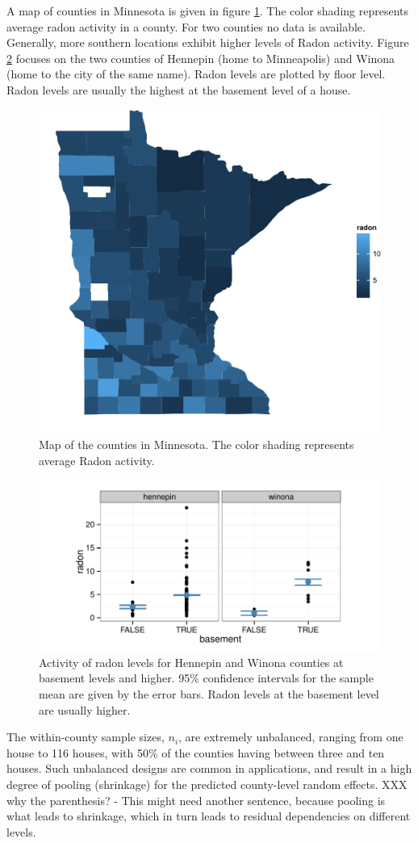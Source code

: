 \documentclass[12pt]{article} %
\newcommand{\hh}[1]{{\color{orange} #1}}
\newcommand{\al}[1]{{\color{red} #1}}
\begin{document}
A map of counties in Minnesota is given in figure \ref{fig:map}. The color shading represents average radon activity in a county. For two counties no data is available. Generally, more southern locations exhibit higher  levels of Radon activity. Figure \ref{fig:tc} focuses on the two counties of Hennepin (home to Minneapolis) and Winona (home to the city of the same name). Radon levels are plotted by floor level. Radon levels are usually the highest at the basement level of a house. 
%
\begin{figure}[htb]
\centering
\includegraphics[width=0.5\linewidth]{figures/map-cropped.pdf}
\caption{\label{fig:map} Map of the counties in Minnesota. The color shading represents average Radon activity.}
\end{figure}
%
\begin{figure}[htb]
\centering
\includegraphics[width=0.7\linewidth]{figures/radon-twocounties.pdf}
\caption{\label{fig:tc} Activity of radon levels for Hennepin and Winona counties at basement levels and higher. 95\% confidence intervals for the sample mean are given by the error bars. Radon levels at the basement level are usually higher.}
\end{figure}
%
The within-county sample sizes, $n_i$, are extremely unbalanced, ranging from one house to 116 houses, with 50\% of the counties having between three and ten houses. Such unbalanced designs are common in applications, and result in a high degree of pooling \al{(shrinkage)} for the predicted county-level random effects. \hh{XXX why the parenthesis? - This might need another sentence, because pooling is what leads to shrinkage, which in turn leads to residual dependencies on different levels.}
\end{document}
